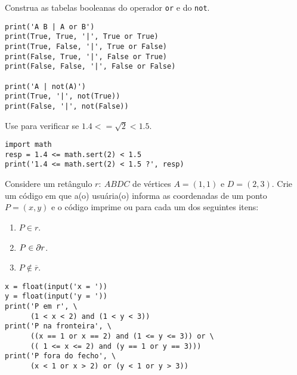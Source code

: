 \begin{exer}
  Construa as tabelas booleanas do operador \texttt{or} e do \texttt{not}.
\end{exer}
\begin{resp}

\begin{lstlisting}
print('A B | A or B')
print(True, True, '|', True or True)
print(True, False, '|', True or False)
print(False, True, '|', False or True)
print(False, False, '|', False or False)

print('A | not(A)')
print(True, '|', not(True))
print(False, '|', not(False))
\end{lstlisting}

\end{resp}

\begin{exer}
  Use {\python} para verificar se $1.4 <= \sqrt{2} < 1.5$.
\end{exer}
\begin{resp}

\begin{lstlisting}
import math
resp = 1.4 <= math.sert(2) < 1.5
print('1.4 <= math.sert(2) < 1.5 ?', resp)
\end{lstlisting}

\end{resp}

\begin{exer}
  Considere um retângulo $r: ~ABDC$ de vértices $A = (1, 1)$ e $D = (2, 3)$. Crie um código em que a(o) usuária(o) informa as coordenadas de um ponto $P = (x, y)$ e o código imprime {\PYTHONTrue} ou {\PYTHONFalse} para cada um dos seguintes itens:
  \begin{enumerate}
  \item $P\in r$.
  \item $P\in \partial r$.
  \item $P\not\in \overline{r}$.
  \end{enumerate}
\end{exer}
\begin{resp}
  
\begin{lstlisting}
x = float(input('x = '))
y = float(input('y = '))
print('P em r', \
      (1 < x < 2) and (1 < y < 3))
print('P na fronteira', \
      ((x == 1 or x == 2) and (1 <= y <= 3)) or \
      (( 1 <= x <= 2) and (y == 1 or y == 3)))
print('P fora do fecho', \
      (x < 1 or x > 2) or (y < 1 or y > 3))
\end{lstlisting}

\end{resp}

